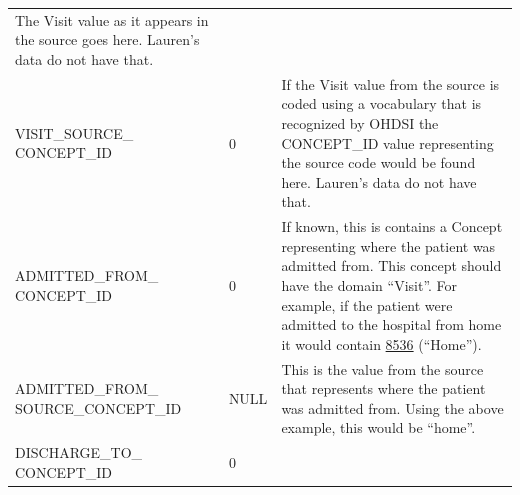 \documentclass[11pt]{book}
\theoremstyle{definition}
\theoremstyle{definition}
\theoremstyle{definition}
\theoremstyle{remark}
\begin{document}
\begin{longtable}[]{@{}lll@{}}
\begin{minipage}[t]{0.49\columnwidth}
The Visit value as it appears in the source goes here. Lauren's data do not have that.\strut
\end{minipage}\tabularnewline
\begin{minipage}[t]{0.28\columnwidth}\raggedright
VISIT\_SOURCE\_ CONCEPT\_ID\strut
\end{minipage} & \begin{minipage}[t]{0.15\columnwidth}\raggedright
0\strut
\end{minipage} & \begin{minipage}[t]{0.49\columnwidth}\raggedright
If the Visit value from the source is coded using a vocabulary that is recognized by OHDSI the CONCEPT\_ID value representing the source code would be found here. Lauren's data do not have that.\strut
\end{minipage}\tabularnewline
\begin{minipage}[t]{0.28\columnwidth}\raggedright
ADMITTED\_FROM\_ CONCEPT\_ID\strut
\end{minipage} & \begin{minipage}[t]{0.15\columnwidth}\raggedright
0\strut
\end{minipage} & \begin{minipage}[t]{0.49\columnwidth}\raggedright
If known, this is contains a Concept representing where the patient was admitted from. This concept should have the domain ``Visit''. For example, if the patient were admitted to the hospital from home it would contain \href{http://athena.ohdsi.org/search-terms/terms/8536}{8536} (``Home'').\strut
\end{minipage}\tabularnewline
\begin{minipage}[t]{0.28\columnwidth}\raggedright
ADMITTED\_FROM\_ SOURCE\_CONCEPT\_ID\strut
\end{minipage} & \begin{minipage}[t]{0.15\columnwidth}\raggedright
NULL\strut
\end{minipage} & \begin{minipage}[t]{0.49\columnwidth}\raggedright
This is the value from the source that represents where the patient was admitted from. Using the above example, this would be ``home''.\strut
\end{minipage}\tabularnewline
\begin{minipage}[t]{0.28\columnwidth}\raggedright
DISCHARGE\_TO\_ CONCEPT\_ID\strut
\end{minipage} & \begin{minipage}[t]{0.15\columnwidth}\raggedright
0\strut
\end{minipage} & \begin{minipage}[t]{0.49\columnwidth}\raggedright

\end{minipage}
\end{longtable}
\end{document}
